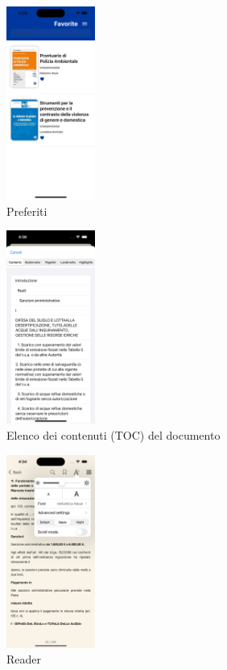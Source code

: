 \begin{multicols}{3}
    \begin{figure}[H]
        \centering
        \includegraphics[width=0.26\textwidth]{img/Simulator Screen Shot - iPhone 14 Pro - 2022-10-05 at 11.20.04.png}
        \caption{Preferiti}
        \label{preferiti-ios}
    \end{figure}

    \begin{figure}[H]
        \centering
        \includegraphics[width=0.26\textwidth]{img/toc_ios.png}
        \caption{Elenco dei contenuti (TOC) del documento}
        \label{toc-ios}
    \end{figure}

    \begin{figure}[H]
        \centering
        \includegraphics[width=0.26\textwidth]{img/reader_settings_ios.png}
        \caption{Reader}
        \label{readersettings-ios}
    \end{figure}
    

\end{multicols}
